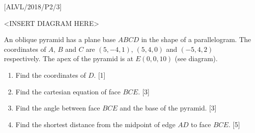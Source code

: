 \item {[}ALVL/2018/P2/3{]}
\noindent \begin{center}
\textless INSERT DIAGRAM HERE\textgreater{}
\par\end{center}

An oblique pyramid has a plane base $ABCD$ in the shape of a parallelogram.
The coordinates of $A$, $B$ and $C$ are $\left(5,-4,1\right)$,
$\left(5,4,0\right)$ and $\left(-5,4,2\right)$ respectively. The
apex of the pyramid is at $E\left(0,0,10\right)$ (see diagram).
\begin{enumerate}
\item Find the coordinates of $D$. \hfill{}{[}1{]}
\item Find the cartesian equation of face $BCE$. \hfill{}{[}3{]}
\item Find the angle between face $BCE$ and the base of the pyramid.\hfill{}
{[}3{]}
\item Find the shortest distance from the midpoint of edge $AD$ to face
$BCE$. \hfill{}{[}5{]}
\end{enumerate}
